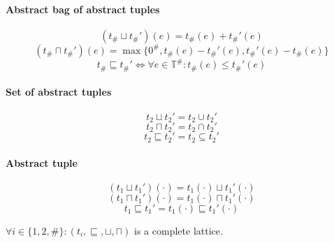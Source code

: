 
\paragraph{Abstract bag of abstract tuples}

\begin{equation*}
    (t_\# \sqcup t_\#')(e) = t_\#(e) + t_\#'(e)
\end{equation*}
\begin{equation*}
    (t_\# \sqcap t_\#')(e) = \max\{0^\#, t_\#(e) - t_\#'(e), t_\#'(e) - t_\#(e)\}
\end{equation*}
\begin{equation*}
    t_\# \sqsubseteq t_\#' \iff \forall e \in \mathbb{T}^\# : t_\#(e) \leq t_\#'(e)
\end{equation*}

\paragraph{Set of abstract tuples}

\begin{equation*}
    t_2 \sqcup t_2' = t_2 \cup t_2'
\end{equation*}
\begin{equation*}
    t_2 \sqcap t_2' = t_2 \cap t_2'
\end{equation*}
\begin{equation*}
    t_2 \sqsubseteq t_2' = t_2 \subseteq t_2'
\end{equation*}

\paragraph{Abstract tuple}

\begin{equation*}
    (t_1 \sqcup t_1')(\cdot) = t_1(\cdot) \sqcup t_1'(\cdot)
\end{equation*}
\begin{equation*}
    (t_1 \sqcap t_1')(\cdot) = t_1(\cdot) \sqcap t_1'(\cdot)
\end{equation*}
\begin{equation*}
    t_1 \sqsubseteq t_1' = t_1(\cdot) \sqsubseteq t_1'(\cdot)
\end{equation*}

\begin{theorem}
    $\forall i \in \{1, 2, \#\} : (t_i, \sqsubseteq, \sqcup, \sqcap)$ is a complete lattice.
\end{theorem}
